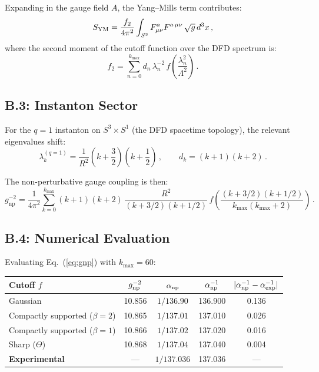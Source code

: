 \documentclass[11pt,a4paper]{article}
\begin{document}
Expanding in the gauge field $A$, the Yang--Mills term contributes:
\begin{equation}
S_{\rm YM} = \frac{f_2}{4\pi^2}\int_{S^3} F_{\mu\nu}^a F^{a\,\mu\nu}\,\sqrt{g}\,d^3x\,,
\end{equation}
where the second moment of the cutoff function over the DFD spectrum is:
\begin{equation}
f_2 = \sum_{n=0}^{k_{\max}} d_n\,\lambda_n^{-2}\,f\!\left(\frac{\lambda_n^2}{\Lambda^2}\right)\,.
\end{equation}

\subsection{B.3: Instanton Sector}

For the $q = 1$ instanton on $S^3 \times S^1$ (the DFD spacetime topology), the relevant eigenvalues shift:
\begin{equation}
\lambda_k^{(q=1)} = \frac{1}{R^2}\left(k + \frac{3}{2}\right)\left(k + \frac{1}{2}\right)\,, \qquad d_k = (k+1)(k+2)\,.
\end{equation}

The non-perturbative gauge coupling is then:
\begin{equation}
\label{eq:gnp}
g^{-2}_{\mathrm{np}} = \frac{1}{4\pi^2}\sum_{k=0}^{k_{\max}} (k+1)(k+2)\,\frac{R^2}{(k + 3/2)(k + 1/2)}\,f\!\left(\frac{(k+3/2)(k+1/2)}{k_{\max}(k_{\max}+2)}\right)\,.
\end{equation}

\subsection{B.4: Numerical Evaluation}

Evaluating Eq.~(\ref{eq:gnp}) with $k_{\max} = 60$:

\begin{center}
\begin{tabular}{lcccc}
\toprule
\textbf{Cutoff $f$} & $g^{-2}_{\rm np}$ & $\alpha_{\rm np}$ & $\alpha^{-1}_{\rm np}$ & \textbf{$|\alpha^{-1}_{\rm np} - \alpha^{-1}_{\rm exp}|$} \\
\midrule
Gaussian & 10.856 & $1/136.90$ & 136.900 & 0.136 \\
Compactly supported ($\beta = 2$) & 10.865 & $1/137.01$ & 137.010 & 0.026 \\
Compactly supported ($\beta = 1$) & 10.866 & $1/137.02$ & 137.020 & 0.016 \\
Sharp ($\Theta$) & 10.868 & $1/137.04$ & 137.040 & 0.004 \\
\midrule
\textbf{Experimental} & --- & $1/137.036$ & 137.036 & --- \\
\bottomrule
\end{tabular}
\end{center}
\end{document}
